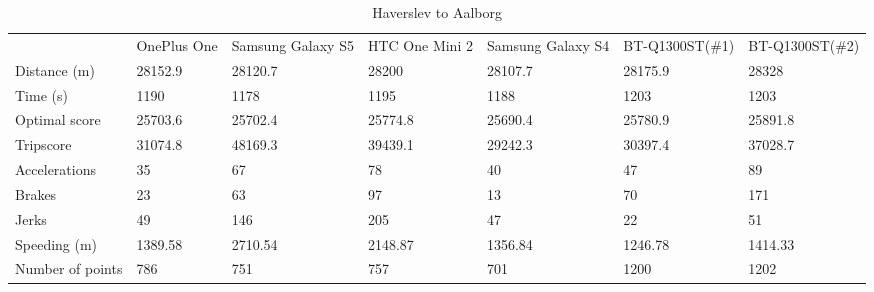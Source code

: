 \begin{table}[]
\centering
\caption{Haverslev to Aalborg}
\label{my-label}
\begin{tabular}{lllllll}
                 & OnePlus One & Samsung Galaxy S5 & HTC One Mini 2 & Samsung Galaxy S4 & BT-Q1300ST(\#1) & BT-Q1300ST(\#2) \\
Distance (m)     & 28152.9     & 28120.7           & 28200          & 28107.7           & 28175.9         & 28328           \\
Time (s)         & 1190        & 1178              & 1195           & 1188              & 1203            & 1203            \\
Optimal score    & 25703.6     & 25702.4           & 25774.8        & 25690.4           & 25780.9         & 25891.8         \\
Tripscore        & 31074.8     & 48169.3           & 39439.1        & 29242.3           & 30397.4         & 37028.7         \\
Accelerations    & 35          & 67                & 78             & 40                & 47              & 89              \\
Brakes           & 23          & 63                & 97             & 13                & 70              & 171             \\
Jerks            & 49          & 146               & 205            & 47                & 22              & 51              \\
Speeding (m)     & 1389.58     & 2710.54           & 2148.87        & 1356.84           & 1246.78         & 1414.33         \\
Number of points & 786         & 751               & 757            & 701               & 1200            & 1202           
\end{tabular}
\end{table}

